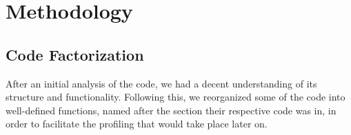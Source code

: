 \documentclass[10pt,journal,compsoc]{IEEEtran}
\begin{document}
%



\section{Methodology}

\subsection{Code Factorization }
After an initial analysis of the code, we had a decent understanding of its structure and functionality. Following this, we reorganized some of the code into well-defined functions, named after the section their respective code was in, in order to facilitate the profiling that would take place later on.
\end{document}
